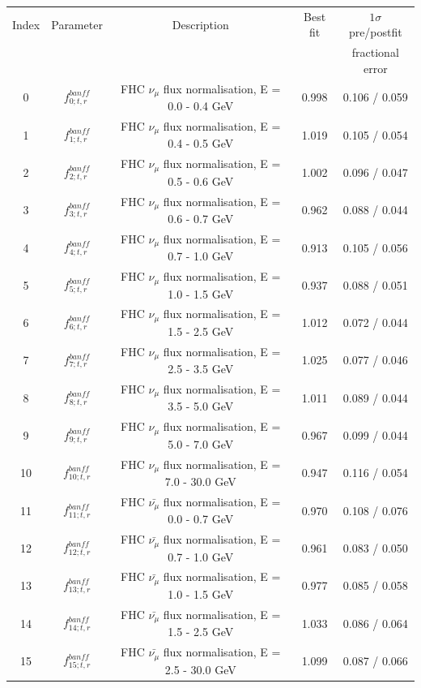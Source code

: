 \begin{tabular} { | c | c | c | c | c |  }
\hline 
Index & Parameter & Description & Best fit & $1\sigma$ pre/postfit\\ 
 & &  &  & fractional error\\
\hline 
0 & $f_{0; t, r}^{banff}$ & FHC $\nu_\mu$ flux normalisation, E = 0.0 - 0.4 GeV & 0.998 & 0.106 / 0.059\\ 
1 & $f_{1; t, r}^{banff}$ & FHC $\nu_\mu$ flux normalisation, E = 0.4 - 0.5 GeV & 1.019 & 0.105 / 0.054\\ 
2 & $f_{2; t, r}^{banff}$ & FHC $\nu_\mu$ flux normalisation, E = 0.5 - 0.6 GeV & 1.002 & 0.096 / 0.047\\ 
3 & $f_{3; t, r}^{banff}$ & FHC $\nu_\mu$ flux normalisation, E = 0.6 - 0.7 GeV & 0.962 & 0.088 / 0.044\\ 
4 & $f_{4; t, r}^{banff}$ & FHC $\nu_\mu$ flux normalisation, E = 0.7 - 1.0 GeV & 0.913 & 0.105 / 0.056\\ 
5 & $f_{5; t, r}^{banff}$ & FHC $\nu_\mu$ flux normalisation, E = 1.0 - 1.5 GeV & 0.937 & 0.088 / 0.051\\ 
6 & $f_{6; t, r}^{banff}$ & FHC $\nu_\mu$ flux normalisation, E = 1.5 - 2.5 GeV & 1.012 & 0.072 / 0.044\\ 
7 & $f_{7; t, r}^{banff}$ & FHC $\nu_\mu$ flux normalisation, E = 2.5 - 3.5 GeV & 1.025 & 0.077 / 0.046\\ 
8 & $f_{8; t, r}^{banff}$ & FHC $\nu_\mu$ flux normalisation, E = 3.5 - 5.0 GeV & 1.011 & 0.089 / 0.044\\ 
9 & $f_{9; t, r}^{banff}$ & FHC $\nu_\mu$ flux normalisation, E = 5.0 - 7.0 GeV & 0.967 & 0.099 / 0.044\\ 
10 & $f_{10; t, r}^{banff}$ & FHC $\nu_\mu$ flux normalisation, E = 7.0 - 30.0 GeV & 0.947 & 0.116 / 0.054\\ 
11 & $f_{11; t, r}^{banff}$ & FHC $\bar{\nu_\mu}$ flux normalisation, E = 0.0 - 0.7 GeV & 0.970 & 0.108 / 0.076\\ 
12 & $f_{12; t, r}^{banff}$ & FHC $\bar{\nu_\mu}$ flux normalisation, E = 0.7 - 1.0 GeV & 0.961 & 0.083 / 0.050\\ 
13 & $f_{13; t, r}^{banff}$ & FHC $\bar{\nu_\mu}$ flux normalisation, E = 1.0 - 1.5 GeV & 0.977 & 0.085 / 0.058\\ 
14 & $f_{14; t, r}^{banff}$ & FHC $\bar{\nu_\mu}$ flux normalisation, E = 1.5 - 2.5 GeV & 1.033 & 0.086 / 0.064\\ 
15 & $f_{15; t, r}^{banff}$ & FHC $\bar{\nu_\mu}$ flux normalisation, E = 2.5 - 30.0 GeV & 1.099 & 0.087 / 0.066\\ 

\end{tabular}

